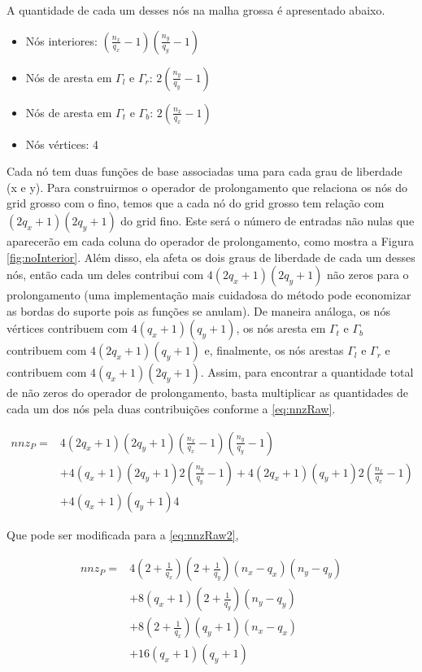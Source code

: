 A quantidade de cada um desses nós na malha grossa é apresentado abaixo.

\begin{itemize}
    \item Nós interiores: $(\frac{n_x}{q_x} - 1) (\frac{n_y}{q_y} - 1)$
    \item Nós de aresta em $\Gamma_l$ e $\Gamma_r$: $2 ( \frac{n_y}{q_y} - 1)$
    \item Nós de aresta em $\Gamma_t$ e $\Gamma_b$: $2 ( \frac{n_x}{q_x} - 1)$
    \item Nós vértices: 4
\end{itemize}


Cada nó tem duas funções de base associadas uma para cada grau de liberdade (x e y). Para construirmos o operador de prolongamento que relaciona os nós do grid grosso com o fino, temos que a cada nó do grid grosso tem relação com $(2q_x+1)(2q_y+1)$ do grid fino. Este será o número de entradas não nulas que aparecerão em cada coluna do operador de prolongamento, como mostra a Figura \ref{fig:noInterior}. Além disso, ela afeta os dois graus de liberdade de cada um desses nós, então cada um deles contribui com $4(2q_x+1)(2q_y+1)$  não zeros para o prolongamento (uma implementação mais cuidadosa do método pode economizar as bordas do suporte pois as funções se anulam). De maneira análoga, os nós vértices contribuem com $ 4 (q_x+1)(q_y+1)$, os nós aresta em $\Gamma_t$ e $\Gamma_b$ contribuem com $ 4 (2q_x+1)(q_y+1) $ e, finalmente, os nós arestas  $\Gamma_l$ e $\Gamma_r$ e contribuem com $ 4(q_x+1)(2q_y+1) $. Assim, para encontrar a quantidade total de não zeros do operador de prolongamento, basta multiplicar as quantidades de cada um dos nós pela duas contribuições conforme a   \eqref{eq:nnzRaw}.


\begin{equation} \label{eq:nnzRaw}
\begin{aligned}
    nnz_P = & 4(2q_x+1)(2q_y+1)  (\frac{n_x}{q_x} - 1) (\frac{n_y}{q_y} - 1)   \\
            & + 4 (q_x+1)(2q_y+1)  2 ( \frac{n_y}{q_y} - 1) +  4 (2q_x+1)(q_y+1)  2 (\frac{n_x}{q_x} - 1) \\
            & +  4(q_x+1)(q_y+1) 4
\end{aligned}
\end{equation}

Que pode ser modificada para a \eqref{eq:nnzRaw2},

\begin{equation} \label{eq:nnzRaw2}
\begin{aligned}
    nnz_P = &   4 (2+\frac{1}{q_x})(2 + \frac{1}{q_y})  (n_x - q_x) (n_y - q_y) \\
            & + 8 (q_x+1)(2 + \frac{1}{q_y})  (n_y - q_y) \\
            & + 8 (2+\frac{1}{q_x})(q_y+1) (n_x - q_x) \\
            & + 16 (q_x+1)(q_y+1)
\end{aligned}
\end{equation}

